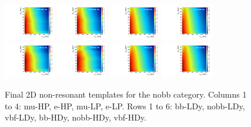 \begin{figure}[htbp]
  \includegraphics[width=0.2\textwidth]{fig/analysisAppendix/template_nonRes_mu_HP_nobb_HDy.pdf}
  \includegraphics[width=0.2\textwidth]{fig/analysisAppendix/template_nonRes_e_HP_nobb_HDy.pdf}
  \includegraphics[width=0.2\textwidth]{fig/analysisAppendix/template_nonRes_mu_LP_nobb_HDy.pdf}
  \includegraphics[width=0.2\textwidth]{fig/analysisAppendix/template_nonRes_e_LP_nobb_HDy.pdf}\\
  \includegraphics[width=0.2\textwidth]{fig/analysisAppendix/template_nonRes_mu_HP_vbf_HDy.pdf}
  \includegraphics[width=0.2\textwidth]{fig/analysisAppendix/template_nonRes_e_HP_vbf_HDy.pdf}
  \includegraphics[width=0.2\textwidth]{fig/analysisAppendix/template_nonRes_mu_LP_vbf_HDy.pdf}
  \includegraphics[width=0.2\textwidth]{fig/analysisAppendix/template_nonRes_e_LP_vbf_HDy.pdf}\\
  \caption{
    Final 2D non-resonant templates for the nobb category.
    Columns 1 to 4: mu-HP, e-HP, mu-LP, e-LP.
    Rows 1 to 6: bb-LDy, nobb-LDy, vbf-LDy, bb-HDy, nobb-HDy, vbf-HDy.
  }
  \label{fig:templates_nonRes_Run2}
\end{figure}

